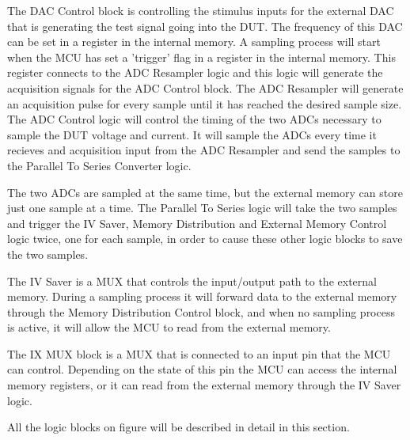 The DAC Control block is controlling the stimulus inputs for the external DAC that is generating the test signal going into the DUT. The frequency of this DAC can be set in a register in the internal memory. A sampling process will start when the MCU has set a 'trigger' flag in a register in the internal memory. This register connects to the ADC Resampler logic and this logic will generate the acquisition signals for the ADC Control block. The ADC Resampler will generate an acquisition pulse for every sample until it has reached the desired sample size. The ADC Control logic will control the timing of the two ADCs necessary to sample the DUT voltage and current. It will sample the ADCs every time it recieves and acquisition input from the ADC Resampler and send the samples to the Parallel To Series Converter logic.

The two ADCs are sampled at the same time, but the external memory can store just one sample at a time. The Parallel To Series logic will take the two samples and trigger the IV Saver, Memory Distribution and External Memory Control logic twice, one for each sample, in order to cause these other logic blocks to save the two samples.

The IV Saver is a MUX that controls the input/output path to the external memory. During a sampling process it will forward data to the external memory through the Memory Distribution Control block, and when no sampling process is active, it will allow the MCU to read from the external memory.

The IX MUX block is a MUX that is connected to an input pin that the MCU can control. Depending on the state of this pin the MCU can access the internal memory registers, or it can read from the external memory through the IV Saver logic.

All the logic blocks on figure  will be described in detail in this section.